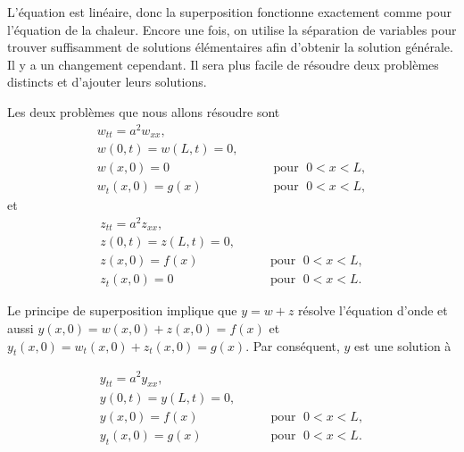 L'équation est linéaire,  donc la superposition fonctionne exactement comme pour l'équation de la chaleur.  Encore une fois, on utilise la séparation de variables pour trouver
suffisamment de solutions élémentaires afin d'obtenir la solution générale.  Il y a
un changement cependant.  Il sera plus facile de résoudre deux problèmes distincts
et d'ajouter leurs solutions.


Les deux problèmes que nous allons résoudre sont
\begin{equation} \label{wave:weq}
\begin{array}{ll}
w_{tt} = a^2 w_{xx} , &  \\
w(0,t) = w(L,t) = 0 , &  \\
w(x,0) = 0 & \qquad \text{pour } \; 0 < x < L , \\
w_t(x,0) = g(x) & \qquad \text{pour } \; 0 < x < L ,
\end{array}
\end{equation}
et
\begin{equation} \label{wave:zeq}
\begin{array}{ll}
z_{tt} = a^2 z_{xx} , &  \\
z(0,t) = z(L,t) = 0 , &  \\
z(x,0) = f(x) & \qquad \text{pour } \; 0 < x < L , \\
z_t(x,0) = 0 & \qquad \text{pour } \; 0 < x < L .
\end{array}
\end{equation}

Le principe de superposition implique que 
$y = w + z$ résolve l'équation d'onde et aussi 
$y(x,0) = w(x,0) + z(x,0) = f(x)$ et
$y_t(x,0) = w_t(x,0) + z_t(x,0) = g(x)$.  Par conséquent,  $y$ est une solution à 

\begin{equation} \label{wave:yeq}
\begin{array}{ll}
y_{tt} = a^2 y_{xx} , &  \\
y(0,t) = y(L,t) = 0 , &  \\
y(x,0) = f(x) & \qquad \text{pour } \; 0 < x < L , \\
y_t(x,0) = g(x) & \qquad \text{pour } \; 0 < x < L .
\end{array}
\end{equation}

